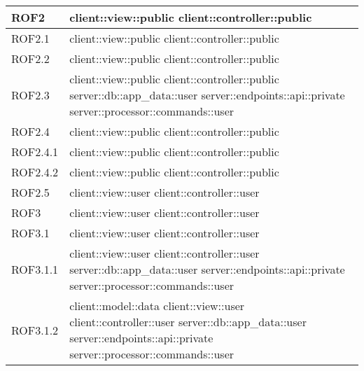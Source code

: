 \begin{center}
\begin{longtable}{| p{4cm} | p{8cm} |}
\hline
ROF2 & client::view::public \newline client::controller::public \\
\hline
ROF2.1 & client::view::public \newline client::controller::public \\
\hline
ROF2.2 & client::view::public \newline client::controller::public \\
\hline
ROF2.3 & client::view::public \newline client::controller::public \newline server::db::app\_data::user \newline server::endpoints::api::private \newline server::processor::commands::user \\
\hline
ROF2.4 & client::view::public \newline client::controller::public \\
\hline
ROF2.4.1 & client::view::public \newline client::controller::public \\
\hline
ROF2.4.2 & client::view::public \newline client::controller::public \\
\hline
ROF2.5 & client::view::user \newline client::controller::user \\
\hline
ROF3 & client::view::user \newline client::controller::user \\
\hline
ROF3.1 & client::view::user \newline client::controller::user \\
\hline
ROF3.1.1 & client::view::user \newline client::controller::user \newline server::db::app\_data::user \newline server::endpoints::api::private \newline server::processor::commands::user \\
\hline
ROF3.1.2 & client::model::data \newline client::view::user \newline client::controller::user \newline server::db::app\_data::user \newline server::endpoints::api::private \newline server::processor::commands::user \\

\end{longtable}
\end{center}
